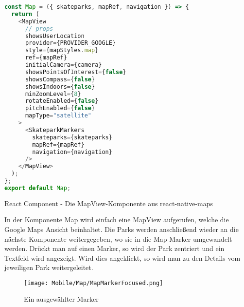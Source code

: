 \begin{code}[htp]
\begin{lstlisting}[firstnumber=1,language=JavaScript, style=JSX]
const Map = ({ skateparks, mapRef, navigation }) => {
  return (
    <MapView
      // props
      showsUserLocation
      provider={PROVIDER_GOOGLE}
      style={mapStyles.map}
      ref={mapRef}
      initialCamera={camera}
      showsPointsOfInterest={false}
      showsCompass={false}
      showsIndoors={false}
      minZoomLevel={8}
      rotateEnabled={false}
      pitchEnabled={false}
      mapType="satellite"
    >
      <SkateparkMarkers
        skateparks={skateparks}
        mapRef={mapRef}
        navigation={navigation}
      />
    </MapView>
  );
};
export default Map;
\end{lstlisting}
\caption{React Component - Die MapView-Komponente aus react-native-maps}
\end{code}

In der Komponente Map wird einfach eine MapView aufgerufen, welche die Google Maps Ansicht
beinhaltet. Die Parks werden anschließend wieder an die nächste Komponente weitergegeben, wo sie in
die Map-Marker umgewandelt werden. Drückt man auf einen Marker, so wird der Park zentriert und ein
Textfeld wird angezeigt. Wird dies angeklickt, so wird man zu den Details vom jeweiligen Park
weitergeleitet.

\begin{figure}[H]
  \begin{center}
    \texttt{[image: Mobile/Map/MapMarkerFocused.png]}
    \caption{Ein ausgewählter Marker}
  \end{center}
\end{figure}
